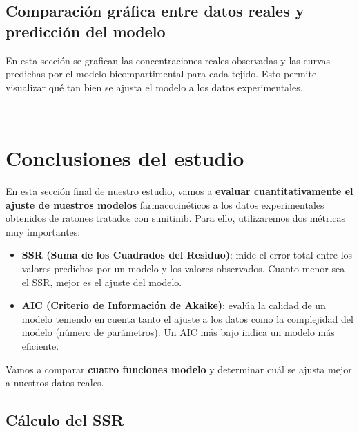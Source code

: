 \documentclass[11pt]{article}
\begin{document}
    \subsection{Comparación gráfica entre datos reales y predicción del
modelo}\label{comparaciuxf3n-gruxe1fica-entre-datos-reales-y-predicciuxf3n-del-modelo}

En esta sección se grafican las concentraciones reales observadas y las
curvas predichas por el modelo bicompartimental para cada tejido. Esto
permite visualizar qué tan bien se ajusta el modelo a los datos
experimentales.

    \begin{center}
    \end{center}
    { \hspace*{\fill} \\}
    
    \section{Conclusiones del estudio}\label{conclusiones-del-estudio}

En esta sección final de nuestro estudio, vamos a \textbf{evaluar
cuantitativamente el ajuste de nuestros modelos} farmacocinéticos a los
datos experimentales obtenidos de ratones tratados con sunitinib. Para
ello, utilizaremos dos métricas muy importantes:

\begin{itemize}
\item
  \textbf{SSR (Suma de los Cuadrados del Residuo)}: mide el error total
  entre los valores predichos por un modelo y los valores observados.
  Cuanto menor sea el SSR, mejor es el ajuste del modelo.
\item
  \textbf{AIC (Criterio de Información de Akaike)}: evalúa la calidad de
  un modelo teniendo en cuenta tanto el ajuste a los datos como la
  complejidad del modelo (número de parámetros). Un AIC más bajo indica
  un modelo más eficiente.
\end{itemize}

Vamos a comparar \textbf{cuatro funciones modelo} y determinar cuál se
ajusta mejor a nuestros datos reales.

    \subsection{Cálculo del SSR}\label{cuxe1lculo-del-ssr}
\end{document}
